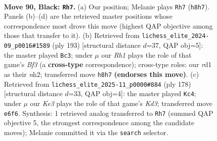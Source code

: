 \documentclass[11pt]{article}
\begin{document}
\begin{figure}[p]\centering
\begin{subfigure}{0.46\textwidth}\centering
\resizebox{\linewidth}{!}{%
\newchessgame
\chessboard[
  setfen={7r/8/p3k3/P1p2p1p/1pp2P1P/4P1P1/1P6/3R2K1 b - - 1 90},
  showmover=false,
  pgfstyle=straightmove, color=movearrow, markmove={h8-h7}
]}
\caption{}
\end{subfigure}\hfill
\begin{subfigure}{0.46\textwidth}\centering
\resizebox{\linewidth}{!}{%
\newchessgame
\chessboard[
  setfen={8/8/1pp1kb2/p1p3p1/P1P1K2p/1P5P/6PN/8 b - - 7 97},
  showmover=false,
  pgfstyle=straightmove, color=movearrow, markmove={f6-c3}
]}
\caption{}
\end{subfigure}
\\[4pt]
\begin{subfigure}{0.46\textwidth}\centering
\resizebox{\linewidth}{!}{%
\newchessgame
\chessboard[
  setfen={8/1p6/p1pr1kp1/P6p/1P3P1P/3KP3/8/1R6 w - - 15 90},
  showmover=false,
  pgfstyle=straightmove, color=movearrow, markmove={d3-c4}
]}
\caption{}
\end{subfigure}\hfill

\caption{\textbf{Move 90, Black: \texttt{Rh7}.} (a) Our position; Melanie plays \texttt{Rh7} (\texttt{h8h7}). Panels (b)--(d) are the retrieved master positions whose correspondence most drove this move (highest QAP objective among those that transfer to it). (b) Retrieved from \texttt{lichess\_elite\_2024-09\_p0016\#1589} (ply 193) [structural distance $d$=37, QAP obj=5]: the master played \texttt{Bc3}; under $\mu$ our \emph{Rh1} plays the role of that game's \emph{Bf3} (a \textbf{cross-type} correspondence); cross-type roles: our \emph{r}d1 as their \emph{n}h2; transferred move \texttt{h8h7} \textbf{(endorses this move)}. (c) Retrieved from \texttt{lichess\_elite\_2025-11\_p0000\#884} (ply 178) [structural distance $d$=33, QAP obj=4]: the master played \texttt{Kc4}; under $\mu$ our \emph{Ke3} plays the role of that game's \emph{Kd3}; transferred move \texttt{e6f6}. Synthesis: 1 retrieved analog transferred to \texttt{Rh7} (summed QAP objective 5, the strongest correspondence among the candidate moves); Melanie committed it via the \texttt{search} selector.}
\label{fig:thought-m179}
\end{figure}

\clearpage
\end{document}
